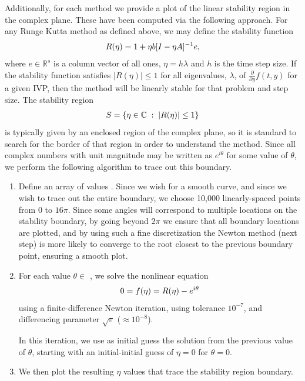 \documentclass[letterpaper,10pt,english]{sphinxmanual}
\begin{document}
Additionally, for each method we provide a plot of the linear
stability region in the complex plane.  These have been computed via
the following approach.  For any Runge Kutta method as defined above,
we may define the stability function
\begin{gather}
\begin{split}R(\eta) = 1 + \eta b [I - \eta A]^{-1} e,\end{split}\notag
\end{gather}
where $e\in\mathbb{R}^s$ is a column vector of all ones, $\eta =
h\lambda$ and $h$ is the time step size.  If the stability
function satisfies $|R(\eta)| \le 1$ for all eigenvalues,
$\lambda$, of $\frac{\partial }{\partial y}f(t,y)$ for a
given IVP, then the method will be linearly stable for that problem
and step size.  The stability region
\begin{gather}
\begin{split}S = \{ \eta\in\mathbb{C}\; :\; |R(\eta)| \le 1\}\end{split}\notag
\end{gather}
is typically given by an enclosed region of the complex plane, so it
is standard to search for the border of that region in order to
understand the method.  Since all complex numbers with unit magnitude
may be written as $e^{i\theta}$ for some value of $\theta$,
we perform the following algorithm to trace out this boundary.
\begin{enumerate}
\item {} 
Define an array of values .  Since we wish for a
smooth curve, and since we wish to trace out the entire boundary,
we choose 10,000 linearly-spaced points from 0 to $16\pi$.
Since some angles will correspond to multiple locations on the
stability boundary, by going beyond $2\pi$ we ensure that all
boundary locations are plotted, and by using such a fine
discretization the Newton method (next step) is more likely to
converge to the root closest to the previous boundary point,
ensuring a smooth plot.

\item {} 
For each value $\theta \in$ , we solve the nonlinear
equation
\begin{gather}
\begin{split}0 = f(\eta) = R(\eta) - e^{i\theta}\end{split}\notag
\end{gather}
using a finite-difference Newton iteration, using tolerance
$10^{-7}$, and differencing parameter
$\sqrt{\varepsilon}$ ($\approx 10^{-8}$).

In this iteration, we use as initial guess the solution from the
previous value of $\theta$, starting with an initial-initial
guess of $\eta=0$ for $\theta=0$.

\item {} 
We then plot the resulting $\eta$ values that trace the
stability region boundary.

\end{enumerate}
\end{document}
